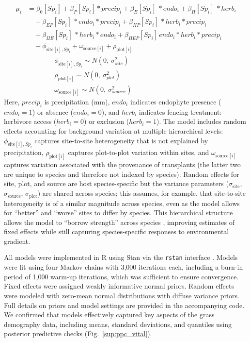 \documentclass[12pt]{article}\usepackage[]{graphicx}\usepackage[dvipsnames]{xcolor}
\begin{document}
\begin{equation}\label{eq:full_model}
\begin{aligned}
\mu_i &= \beta_0[Sp_i] + \beta_P[Sp_i] * precip_i + \beta_{E}[Sp_i]\, * endo_i + \beta_{H}[Sp_i]\, * herb_i \\
&\quad + \beta_{EP}[Sp_i]\, * endo_i * precip_i 
       + \beta_{HP}[Sp_i]\, * herb_i * precip_i \\
&\quad + \beta_{HE}[Sp_i]\, * herb_i * endo_i + \beta_{HEP}[Sp_i]\, endo_i * herb_i * precip_i \\
&\quad  + \phi_{\text{site}[i],Sp_i} 
       + \omega_{\text{source}[i]} 
       + \rho_{\text{plot}[i]}
       \\
&\quad \quad \quad \quad \phi_{\text{site}[i],Sp_i} \sim N(0,\ \sigma^2_{site})\\
&\quad \quad \quad \quad \rho_{\text{plot}[i]} \sim N(0,\ \sigma^2_{plot})\\
&\quad \quad \quad \quad \omega_{\text{source}[i]} \sim N(0,\ \sigma^2_{source})
\end{aligned}
\end{equation}
\noindent Here, $precip_i$ is precipitation (mm), $endo_i$ indicates endophyte presence ($endo_i=1$) or absence ($endo_i=0$), and $herb_i$ indicates fencing treatment: herbivore access ($herb_i=0$) or exclusion ($herb_i=1$).
The model includes random effects accounting for background variation at multiple hierarchical levels: $\phi_{\text{site}[i],Sp_i}$ captures site-to-site heterogeneity that is not explained by precipitation, $\rho_{\text{plot}[i]}$ captures plot-to-plot variation within sites, and $\omega_{\text{source}[i]}$ captures variation associated with the provenance of transplants (the latter two are unique to species and therefore not indexed by species).
Random effects for site, plot, and source are host species-specific but the variance parameters ($\sigma_{\text{site}}$, $\sigma_{\text{source}}$, $\sigma_{\text{plot}}$) are shared across species; this assumes, for example, that site-to-site heterogeneity is of a similar magnitude across species, even as the model allows for ``better'' and ``worse'' sites to differ by species. 
This hierarchical structure allows the model to ``borrow strength'' across species \citep{gelman2007data}, improving estimates of fixed effects while still capturing species-specific responses to environmental gradient.

All models were implemented in R \citep{RCoreTeam} using Stan via the \texttt{rstan} interface \citep{Rstan}. 
Models were fit using four Markov chains with 3,000 iterations each, including a burn-in period of 1,000 warm-up iterations, which was sufficient to ensure convergence.
Fixed effects were assigned weakly informative normal priors. 
Random effects were modeled with zero-mean normal distributions with diffuse variance priors. 
Full details on priors and model settings are provided in the accompanying code.
We confirmed that models effectively captured key aspects of the grass demography data, including means, standard deviations, and quantiles  using posterior predictive checks (Fig.~\ref{sup:ppc_vital}).
\end{document}
